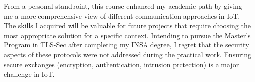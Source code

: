 From a personal standpoint, this course enhanced my academic path by giving me a more comprehensive view of different communication approaches in IoT. The skills I acquired will be valuable for future projects that require choosing the most appropriate solution for a specific context.
Intending to pursue the Master's Program in TLS-Sec after completing my INSA degree, I regret that the security aspects of these protocols were not addressed during the practical work. Ensuring secure exchanges (encryption, authentication, intrusion protection) is a major challenge in IoT.
